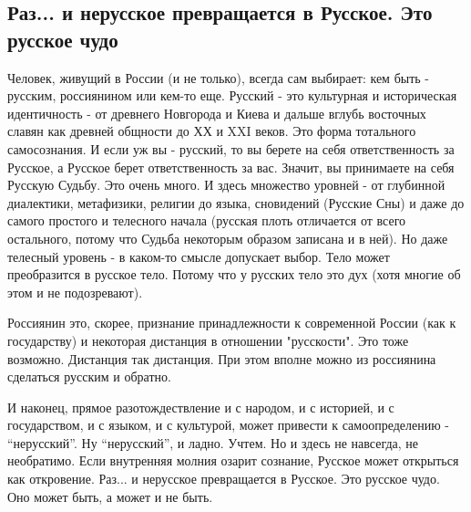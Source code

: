 
 
 
 
 
\subsection{Раз...  и нерусское превращается в Русское. Это русское чудо}

Человек, живущий в России (и не только), всегда сам выбирает: кем быть -
русским, россиянином или кем-то еще. Русский - это культурная и историческая
идентичность - от древнего Новгорода и Киева и дальше вглубь восточных славян
как древней общности до ХХ и XXI веков. Это форма тотального самосознания. И
если уж вы - русский, то вы берете на себя ответственность за Русское, а
Русское берет ответственность за вас. Значит, вы принимаете на себя Русскую
Судьбу. Это очень много. И здесь множество уровней - от глубинной диалектики,
метафизики, религии до языка, сновидений (Русские Сны) и даже до самого
простого и телесного начала (русская плоть отличается от всего остального,
потому что Судьба некоторым образом записана и в ней). Но даже телесный уровень
- в каком-то смысле допускает выбор. Тело может преобразится в русское тело.
Потому что у русских тело это дух (хотя многие об этом и не подозревают).

Россиянин это, скорее, признание принадлежности к современной России (как к
государству) и некоторая дистанция в отношении "русскости". Это тоже возможно.
Дистанция так дистанция. При этом вполне можно из россиянина сделаться русским
и обратно. 

И наконец, прямое разотождествление и с народом, и с историей, и с
государством, и с языком, и с культурой, может привести к самоопределению -
\enquote{нерусский}. Ну \enquote{нерусский}, и ладно. Учтем. Но и здесь не навсегда, не
необратимо. Если внутренняя молния озарит сознание, Русское может открыться как
откровение. Раз...  и нерусское превращается в Русское. Это русское чудо. Оно
может быть, а может и не быть.

